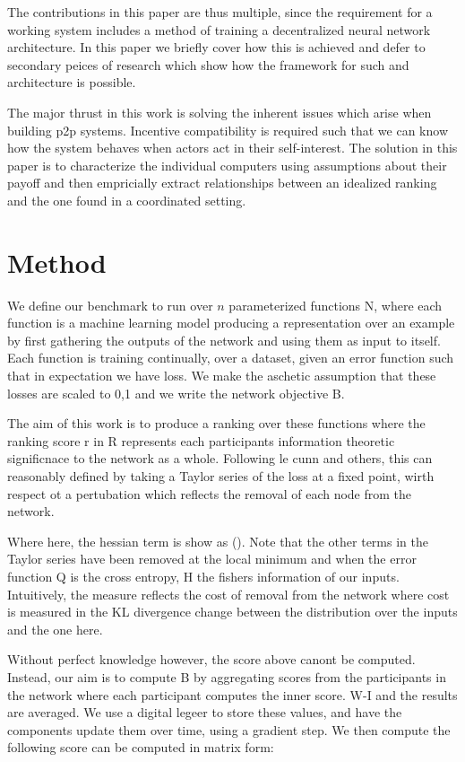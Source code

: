 \documentclass{article}
\begin{document}
The contributions in this paper are thus multiple, since the requirement for a working system includes a method of training a decentralized neural network architecture. In this paper we briefly cover how this is achieved and defer to secondary peices of research which show how the framework for such and architecture is possible. 

The major thrust in this work is solving the inherent issues which arise when building p2p systems. Incentive compatibility is required such that we can know how the system behaves when actors act in their self-interest. The solution in this paper is to characterize the individual computers using assumptions about their payoff and then empricially extract relationships between an idealized ranking and the one found in a coordinated setting. 

\section{Method}

We define our benchmark to run over $n$ parameterized functions N, where each function is a machine learning model producing a representation over an example by first gathering the outputs of the network and using them as input to itself. Each function is training continually, over a dataset, given an error function such that in expectation we have loss. We make the aschetic assumption that these losses are scaled to 0,1 and we write the network objective B.

The aim of this work is to produce a ranking over these functions where the ranking score r in R represents each participants information theoretic significnace to the network as a whole. Following le cunn and others, this can reasonably defined by taking a Taylor series of the loss at a fixed point, wirth respect ot a pertubation which reflects the removal of each node from the network.  


Where here, the hessian term is show as (). Note that the other terms in the Taylor series have been removed at the local minimum and when the error function Q is the cross entropy, H the fishers information of our inputs. Intuitively, the measure reflects the cost of removal from the network where cost is measured in the KL divergence change between the distribution over the inputs and the one here. 

Without perfect knowledge however, the score above canont be computed. Instead, our aim is to compute B by aggregating scores from the participants in the network where each participant computes the inner score. W-I and the results are averaged. We use a digital legeer to store these values, and have the components update them over time, using a gradient step. We then compute the following score can be computed in matrix form: 
\end{document}
